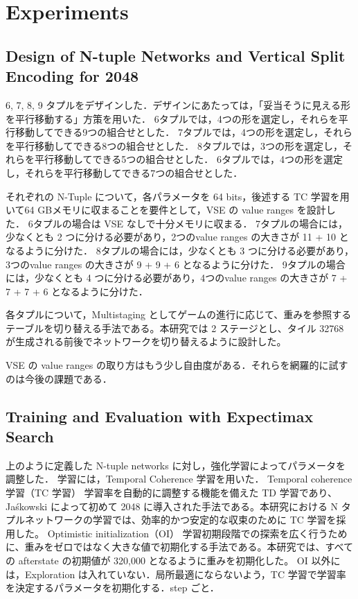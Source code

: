 \section{Experiments}

\subsection{Design of N-tuple Networks and Vertical Split Encoding for 2048}

6, 7, 8, 9 タプルをデザインした．デザインにあたっては，「妥当そうに見える形を平行移動する」方策を用いた．
6タプルでは，4つの形を選定し，それらを平行移動してできる9つの組合せとした．
7タプルでは，4つの形を選定し，それらを平行移動してできる8つの組合せとした．
8タプルでは，3つの形を選定し，それらを平行移動してできる5つの組合せとした．
6タプルでは，4つの形を選定し，それらを平行移動してできる7つの組合せとした．

それぞれの N-Tuple について，各パラメータを 64 bits，後述する TC 学習を用いて64 GBメモリに収まることを要件として，VSE の value ranges を設計した．
6タプルの場合は VSE なしで十分メモリに収まる．
7タプルの場合には，少なくとも 2 つに分ける必要があり，2つのvalue ranges の大きさが 11 + 10 となるように分けた．
8タプルの場合には，少なくとも 3 つに分ける必要があり，3つのvalue ranges の大きさが 9 + 9 + 6 となるように分けた．
9タプルの場合には，少なくとも 4 つに分ける必要があり，4つのvalue ranges の大きさが 7 + 7 + 7 + 6 となるように分けた．

各タプルについて，Multistaging としてゲームの進行に応じて、重みを参照するテーブルを切り替える手法である。本研究では 2 ステージとし、タイル 32768 が生成される前後でネットワークを切り替えるように設計した。

VSE の value ranges の取り方はもう少し自由度がある．それらを網羅的に試すのは今後の課題である．

\subsection{Training and Evaluation with Expectimax Search}

上のように定義した N-tuple networks に対し，強化学習によってパラメータを調整した．
学習には，Temporal Coherence 学習を用いた．
	Temporal coherence 学習（TC 学習）
学習率を自動的に調整する機能を備えた TD 学習であり、Jaśkowski によって初めて 2048 に導入された手法である。本研究における N タプルネットワークの学習では、効率的かつ安定的な収束のために TC 学習を採用した。
	Optimistic initialization（OI）
学習初期段階での探索を広く行うために、重みをゼロではなく大きな値で初期化する手法である。本研究では、すべての afterstate の初期値が 320,000 となるように重みを初期化した。
OI 以外には，Exploration は入れていない．局所最適にならないよう，TC 学習で学習率を決定するパラメータを初期化する．step ごと．

